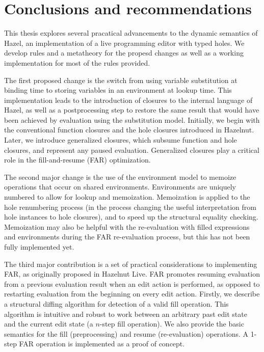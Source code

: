 \chapter{Conclusions and recommendations}
\label{sec:concl}

This thesis explores several pracatical advancements to the dynamic semantics of Hazel, an implementation of a live programming editor with typed holes. We develop rules and a metatheory for the propesd changes as well as a working implementation for most of the rules provided.

The first proposed change is the switch from using variable substitution at binding time to storing variables in an environment at lookup time. This implementation leads to the introduction of closures to the internal language of Hazel, as well as a postprocessing step to restore the same result that would have been achieved by evaluation using the substitution model. Initially, we begin with the conventional function closures and the hole closures introduced in Hazelnut. Later, we introduce generalized closures, which subsume function and hole closures, and represent any paused evaluation. Generalized closures play a critical role in the fill-and-resume (FAR) optimization.

The second major change is the use of the environment model to memoize operations that occur on shared environments. Environments are uniquely numbered to allow for lookup and memoization. Memoization is applied to the hole renumbering process (in the process changing the useful interpretation from hole instances to hole closures), and to speed up the structural equality checking. Memoization may also be helpful with the re-evaluation with filled expressions and environments during the FAR re-evaluation process, but this has not been fully implemented yet.

The third major contribution is a set of practical considerations to implementing FAR, as originally proposed in Hazelnut Live. FAR promotes resuming evaluation from a previous evaluation result when an edit action is performed, as opposed to restarting evaluation from the beginning on every edit action.  Firstly, we describe a structural diffing algorithm for detection of a valid fill operation. This algorithm is intuitive and robust to work between an arbitrary past edit state and the current edit state (a $n$-step fill operation). We also provide the basic semantics for the fill (preprocessing) and resume (re-evaluation) operations. A 1-step FAR operation is implemented as a proof of concept.

